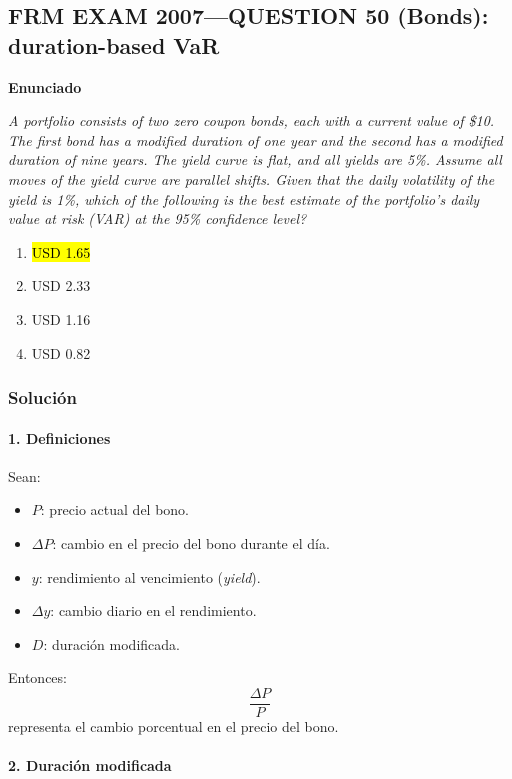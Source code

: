 ﻿\subsection{FRM EXAM 2007---QUESTION 50 (Bonds): duration-based VaR}

\textbf{Enunciado}

\emph{A portfolio consists of two zero coupon bonds, each with a current value of \$10. 
The first bond has a modified duration of one year and the second has a modified duration 
of nine years. The yield curve is flat, and all yields are 5\%. Assume all moves of the 
yield curve are parallel shifts. Given that the daily volatility of the yield is 1\%, 
which of the following is the best estimate of the portfolio’s daily value at risk (VAR) 
at the 95\% confidence level?}
\begin{enumerate}[label=\alph*.]
\item \hl{USD 1.65}
\item USD 2.33
\item USD 1.16
\item USD 0.82
\end{enumerate}

\subsubsection*{Solución}

\paragraph{1. Definiciones} Sean: 

\begin{itemize}
    \item \(P\): precio actual del bono.
    \item \(\Delta P\): cambio en el precio del bono durante el día.
    \item \(y\): rendimiento al vencimiento (\emph{yield}).
    \item \(\Delta y\): cambio diario en el rendimiento.
    \item \(D\): duración modificada.
\end{itemize}

\vspace{0.5cm}

Entonces:
\[
\frac{\Delta P}{P}
\]
representa el cambio porcentual en el precio del bono.\\

\paragraph{2. Duración modificada}

